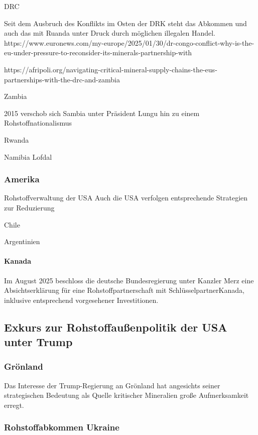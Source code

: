 \documentclass[12pt,a4paper,oneside]{book} %
\begin{document}
DRC

Seit dem Ausbruch des Konflikts im Osten der DRK steht das Abkommen und auch das mit Ruanda unter Druck durch möglichen illegalen Handel.
https://www.euronews.com/my-europe/2025/01/30/dr-congo-conflict-why-is-the-eu-under-pressure-to-reconsider-its-minerals-partnership-with

https://afripoli.org/navigating-critical-mineral-supply-chains-the-eus-partnerships-with-the-drc-and-zambia

Zambia

2015 verschob sich Sambia unter Präsident Lungu hin zu einem Rohstoffnationalismus 

Rwanda

Namibia
Lofdal 






\subsubsection{Amerika}
Rohstoffverwaltung der USA
Auch die USA verfolgen entsprechende Strategien zur Reduzierung 



Chile

Argentinien

\paragraph{Kanada}

Im August 2025 beschloss die deutsche Bundesregierung unter Kanzler Merz eine Absichtserklärung für eine Rohstoffpartnerschaft mit \glqq Schlüsselpartner\grqq Kanada, inklusive entsprechend vorgesehener Investitionen.\

\subsection{Exkurs zur Rohstoffaußenpolitik der USA unter Trump}

\subsubsection{Grönland}

Das Interesse der Trump-Regierung an Grönland hat angesichts seiner strategischen Bedeutung als Quelle kritischer Mineralien große Aufmerksamkeit erregt.

\subsubsection{Rohstoffabkommen Ukraine}
\end{document}
